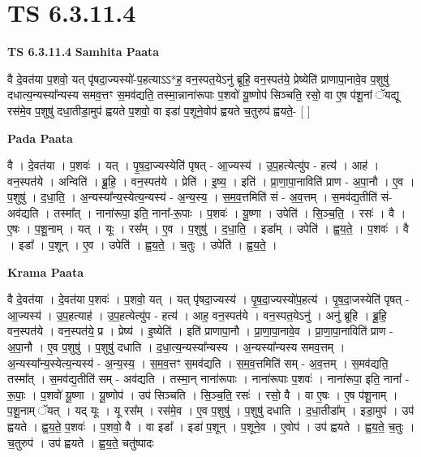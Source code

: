 \documentclass[17pt]{extarticle}
\begin{document}
\section{ TS 6.3.11.4 }

\textbf{TS 6.3.11.4 } \newline
\textbf{Samhita Paata} \newline

वै दे॒वत॑या प॒शवो॒ यत् पृ॑षदा॒ज्यस्यो॑-प॒हत्याऽऽ*ह॒ वन॒स्पत॒येऽनु॑ ब्रूहि॒ वन॒स्पत॑ये॒ प्रेष्येति॑ प्राणापा॒नावे॒व प॒शुषु॑ दधात्य॒न्यस्या᳚न्यस्य समव॒त्तꣳ स॒मव॑द्यति॒ तस्मा॒न्नाना॑रूपाः प॒शवो॑ यू॒ष्णोप॑ सिञ्चति॒ रसो॒ वा ए॒ष प॑शू॒नां ॅयद्यू रस॑मे॒व प॒शुषु॑ दधा॒तीडा॒मुप॑ ह्वयते प॒शवो॒ वा इडा॑ प॒शूने॒वोप॑ ह्वयते च॒तुरुप॑ ह्वयते॒- [  ] \newline

\textbf{Pada Paata} \newline

वै । दे॒वत॑या । प॒शवः॑ । यत् । पृ॒ष॒दा॒ज्यस्येति॑ पृषत् - आ॒ज्यस्य॑ । उ॒प॒हत्येत्यु॑प - हत्य॑ । आह॑ । वन॒स्पत॑ये । अन्विति॑ । ब्रू॒हि॒ । वन॒स्पत॑ये । प्रेति॑ । इ॒ष्य॒ । इति॑ । प्रा॒णा॒पा॒नाविति॑ प्राण - अ॒पा॒नौ । ए॒व । प॒शुषु॑ । द॒धा॒ति॒ । अ॒न्यस्या᳚न्य॒स्येत्य॒न्यस्य॑ - अ॒न्य॒स्य॒ । स॒म॒व॒त्तमिति॑ सं - अ॒व॒त्तम् । स॒मव॑द्य॒तीति॑ सं-अव॑द्यति । तस्मा᳚त् । नाना॑रूपा॒ इति॒ नाना᳚-रू॒पाः । प॒शवः॑ । यू॒ष्णा । उपेति॑ । सि॒ञ्च॒ति॒ । रसः॑ । वै । ए॒षः । प॒शू॒नाम् । यत् । यूः । रस᳚म् । ए॒व । प॒शुषु॑ । द॒धा॒ति॒ । इडा᳚म् । उपेति॑ । ह्व॒य॒ते॒ । प॒शवः॑ । वै । इडा᳚ । प॒शून् । ए॒व । उपेति॑ । ह्व॒य॒ते॒ । च॒तुः । उपेति॑ । ह्व॒य॒ते॒ ।  \newline


\textbf{Krama Paata} \newline

वै दे॒वत॑या । दे॒वत॑या प॒शवः॑ । प॒शवो॒ यत् । यत् पृ॑षदा॒ज्यस्य॑ । पृ॒ष॒दा॒ज्यस्यो॑प॒हत्य॑ । पृ॒ष॒दा॒जस्येति॑ पृषत् - आ॒ज्यस्य॑ । उ॒प॒हत्याह॑ । उ॒प॒हत्येत्यु॑प - हत्य॑ । आह॒ वन॒स्पत॑ये । वन॒स्पत॒येऽनु॑ । अनु॑ ब्रूहि । ब्रू॒हि॒ वन॒स्पत॑ये । वन॒स्पत॑ये॒ प्र । प्रेष्य॑ । इ॒ष्येति॑ । इति॑ प्राणापा॒नौ । प्रा॒णा॒पा॒नावे॒व । प्रा॒णा॒पा॒नाविति॑ प्राण - अ॒पा॒नौ । ए॒व प॒शुषु॑ । प॒शुषु॑ दधाति । द॒धा॒त्य॒न्यस्या᳚न्यस्य । अ॒न्यस्या᳚न्यस्य समव॒त्तम् । अ॒न्यस्या᳚न्य॒स्येत्य॒न्यस्य॑ - अ॒न्य॒स्य॒ । स॒म॒व॒त्तꣳ स॒मव॑द्यति । स॒म॒व॒त्तमिति॑ सम् - अ॒व॒त्तम् । स॒मव॑द्यति॒ तस्मा᳚त् । स॒मव॑द्य॒तीति॑ सम् - अव॑द्यति । तस्मा॒न् नाना॑रूपाः । नाना॑रूपाः प॒शवः॑ । नाना॑रूपा॒ इति॒ नाना᳚ - रू॒पाः॒ । प॒शवो॑ यू॒ष्णा । यू॒ष्णोप॑ । उप॑ सिञ्चति । सि॒ञ्च॒ति॒ रसः॑ । रसो॒ वै । वा ए॒षः । ए॒ष प॑शू॒नाम् । प॒शू॒नाम् ॅयत् । यद् यूः । यू रस᳚म् । रस॑मे॒व । ए॒व प॒शुषु॑ । प॒शुषु॑ दधाति । द॒धा॒तीडा᳚म् । इडा॒मुप॑ । उप॑ ह्वयते । ह्व॒य॒ते॒ प॒शवः॑ । प॒शवो॒ वै । वा इडा᳚ । इडा॑ प॒शून् । प॒शूने॒व । ए॒वोप॑ । उप॑ ह्वयते । ह्व॒य॒ते॒ च॒तुः । च॒तुरुप॑ । उप॑ ह्वयते । ह्व॒य॒ते॒ चतु॑ष्पादः \newline
\end{document}
